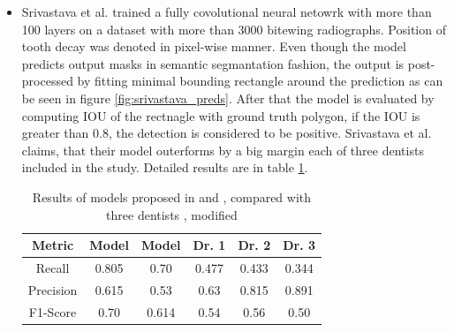 \begin{itemize}
    \item{Srivastava et al. \cite{Srivastava2017}} trained a fully covolutional neural netowrk with more than 100 layers on a dataset with more than 3000 bitewing radiographs. Position of tooth decay was denoted in pixel-wise manner. Even though the model predicts output masks in semantic segmantation fashion, the output is post-processed by fitting minimal bounding rectangle around the prediction as can be seen in figure \ref{fig:srivastava_preds}. After that the model is evaluated by computing IOU of the rectnagle with ground truth polygon, if the IOU is greater than 0.8, the detection is considered to be positive. Srivastava et al. claims, that their model outerforms by a big margin each of three dentists included in the study. Detailed results are in table \ref{tab:srivastava_results}.

          \begin{table}
              \centering
              \begin{tabular}{c||c|c|c|c|c}
                  Metric    & Model \cite{Srivastava2017} & Model \cite{Kumar2018} & Dr. 1 & Dr. 2 & Dr. 3 \\ \hline
                  Recall    & 0.805                       & 0.70                   & 0.477 & 0.433 & 0.344 \\ \hline
                  Precision & 0.615                       & 0.53                   & 0.63  & 0.815 & 0.891 \\ \hline
                  F1-Score  & 0.70                        & 0.614                  & 0.54  & 0.56  & 0.50
              \end{tabular}
              \caption{Results of models proposed in \cite{Srivastava2017} and \cite{Kumar2018}, compared with three dentists , modified}
              \label{tab:srivastava_results}
          \end{table}


\end{itemize}
